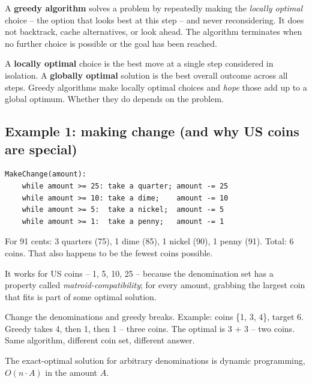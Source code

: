 \documentclass[11pt]{article}
\begin{document}
\begin{defnbox}
A \textbf{greedy algorithm} solves a problem by repeatedly making the
\emph{locally optimal} choice -- the option that looks best at this
step -- and never reconsidering. It does not backtrack, cache
alternatives, or look ahead. The algorithm terminates when no further
choice is possible or the goal has been reached.
\end{defnbox}

\begin{defnbox}
A \textbf{locally optimal} choice is the best move at a single step
considered in isolation. A \textbf{globally optimal} solution is the
best overall outcome across all steps. Greedy algorithms make locally
optimal choices and \emph{hope} those add up to a global optimum.
Whether they do depends on the problem.
\end{defnbox}

\subsection{Example 1: making change (and why US coins are special)}

\begin{examplebox}
\begin{verbatim}
MakeChange(amount):
    while amount >= 25: take a quarter; amount -= 25
    while amount >= 10: take a dime;    amount -= 10
    while amount >= 5:  take a nickel;  amount -= 5
    while amount >= 1:  take a penny;   amount -= 1
\end{verbatim}
For 91 cents: 3 quarters (75), 1 dime (85), 1 nickel (90), 1 penny
(91). Total: 6 coins. That also happens to be the fewest coins
possible.
\end{examplebox}

\begin{warnbox}
It works for US coins -- 1, 5, 10, 25 -- because the denomination set
has a property called \emph{matroid-compatibility}; for every amount,
grabbing the largest coin that fits is part of some optimal solution.

Change the denominations and greedy breaks. Example: coins
\{1, 3, 4\}, target 6. Greedy takes 4, then 1, then 1 -- three coins.
The optimal is 3 + 3 -- two coins. Same algorithm, different coin
set, different answer.

The exact-optimal solution for arbitrary denominations is dynamic
programming, $O(n \cdot A)$ in the amount $A$.
\end{warnbox}
\end{document}
